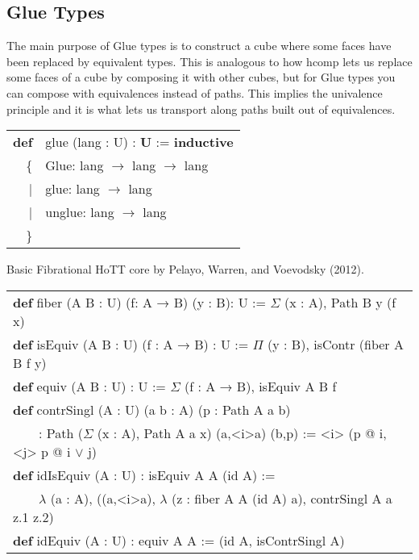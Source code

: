 \documentclass{article}
\theoremstyle{definition}
\newcommand{\tabstyle}[0]{\scriptsize\ttfamily\fontseries{l}\selectfont}
\begin{document}
\newpage
\subsection{Glue Types}

The main purpose of Glue types is to construct a cube where some faces have
been replaced by equivalent types. This is analogous to how hcomp lets us
replace some faces of a cube by composing it with other cubes, but for Glue
types you can compose with equivalences instead of paths. This implies the
univalence principle and it is what lets us transport along paths built
out of equivalences.

\begin{table}[ht]
\tabstyle
\begin{tabular}{rl}
     \textbf{def} & glue (lang : U) : \textbf{U} := \textbf{inductive} \\
 \{ & Glue: lang $\rightarrow$ lang $\rightarrow$ lang \\
  |& glue: lang $\rightarrow$ lang \\
  |& unglue: lang $\rightarrow$ lang \\
                         \} & \\
\end{tabular}
\end{table}

Basic Fibrational HoTT core by Pelayo, Warren, and Voevodsky (2012).

\begin{table}[ht]
\tabstyle
\begin{tabular}{l}
\textbf{def} fiber (A B : U) (f: A → B) (y : B): U := $\Sigma$ (x : A), Path B y (f x) \\
\textbf{def} isEquiv (A B : U) (f : A → B) : U := $\Pi$ (y : B), isContr (fiber A B f y) \\
\textbf{def} equiv (A B : U) : U := $\Sigma$ (f : A → B), isEquiv A B f \\
\textbf{def} contrSingl (A : U) (a b : A) (p : Path A a b) \\
\ \ \ \ : Path ($\Sigma$ (x : A), Path A a x) (a,<i>a) (b,p) := <i> (p @ i, <j> p @ i $\vee$ j) \\
\textbf{def} idIsEquiv (A : U) : isEquiv A A (id A) := \\
\ \ \ \ $\lambda$ (a : A), ((a,<i>a), $\lambda$ (z : fiber A A (id A) a), contrSingl A a z.1 z.2) \\
\textbf{def} idEquiv (A : U) : equiv A A := (id A, isContrSingl A) \\
\end{tabular}
\end{table}
\end{document}
